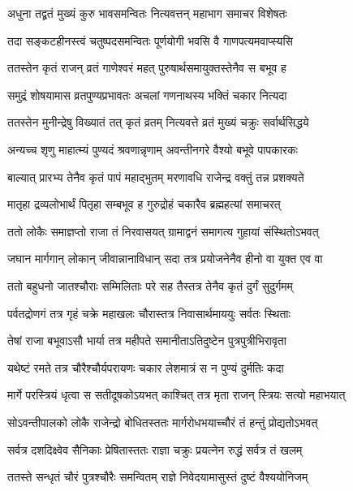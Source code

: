 \twolineshloka
{अधुना तद्व्रतं मुख्यं कुरु भावसमन्वितः}
{नित्यवत्तन् महाभाग समाचर विशेषतः} %

\twolineshloka
{तदा सङ्कटहीनस्त्वं चतुष्पदसमन्वितः}
{पूर्णयोगी भवसि वै गाणपत्यमवाप्स्यसि} %

\twolineshloka
{ततस्तेन कृतं राजन् व्रतं गाणेश्वरं महत्}
{पुरुषार्थसमायुक्तस्तेनैव स बभूव ह} %

\twolineshloka
{समुद्रं शोषयामास व्रतपुण्यप्रभावतः}
{अचलां गणनाथस्य भक्तिं चकार नित्यदा} %

\twolineshloka
{ततस्तेन मुनीन्द्रेषु विख्यातं तत् कृतं व्रतम्}
{नित्यवत्ते व्रतं मुख्यं चक्रुः सर्वार्थसिद्धये} %

\twolineshloka
{अन्यच्च श‍ृणु माहात्म्यं पुण्यदं श्रवणान्नृणाम्}
{अवन्तीनगरे वैश्यो बभूवे पापकारकः} %

\twolineshloka
{बाल्यात् प्रारभ्य तेनैव कृतं पापं महाद्भुतम्}
{मरणावधि राजेन्द्र वक्तुं तन्न प्रशक्यते} %

\twolineshloka
{मातृहा द्रव्यलोभार्थं पितृहा सम्बभूव ह}
{गुरुद्रोहं चकारैव ब्रह्महत्यां समाचरत्} %

\twolineshloka
{ततो लोकैः समाज्ञप्तो राजा तं निरवासयत्}
{ग्रामाद्वनं समागत्य गुहायां संस्थितोऽभवत्} %

\twolineshloka
{जघान मार्गगान् लोकान् जीवान्नानाविधान् सदा}
{तत्र प्रयोजनेनैव हीनो वा युक्त एव वा} %

\twolineshloka
{ततो बहुधनो जातश्चौराः सम्मिलिताः परे}
{सह तैस्तत्र तेनैव कृतं दुर्गं सुदुर्गमम्} %

\twolineshloka
{पर्वतद्रोणगं तत्र गृहं चक्रे महाखलः}
{चौरास्तत्र निवासार्थमाययुः सर्वतः स्थिताः} %

\twolineshloka
{तेषां राजा बभूवाऽसौ भार्या तत्र महीपते}
{समानीताऽतिदुष्टेन पुत्रपुत्रीभिरावृता} %

\twolineshloka
{यथेष्टं रमते तत्र चौरैश्चौर्यपरायणः}
{चकार लेशमात्रं स न पुण्यं दुर्मतिः कदा} %

\twolineshloka
{मार्गे परस्त्रियं धृत्वा स सतीदूषकोऽयभत्}
{काश्चित् तत्र मृता राजन् स्त्रियः सत्यो महाभयात्} %

\twolineshloka
{सोऽवन्तीपालको लोकै राजेन्द्रो बोधितस्ततः}
{मार्गरोधभयाच्चौरं तं हन्तुं प्रोद्यतोऽभवत्} %

\twolineshloka
{सर्वत्र दशदिक्ष्वेव सैनिकाः प्रेषितास्ततः}
{राज्ञा चक्रुः प्रयत्नेन रुद्धं सर्वत्र तं खलम्} %

\twolineshloka
{ततस्ते सन्धृतं चौरं पुत्रश्चौरैः समन्वितम्}
{राज्ञे निवेदयामासुस्तं दुष्टं वैश्ययोनिजम्} %

